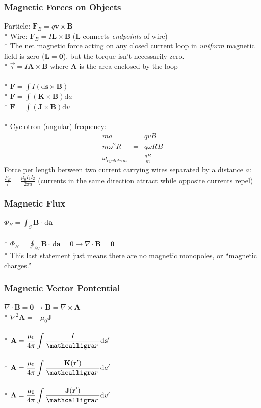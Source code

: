 \subsubsection{Magnetic Forces on Objects}
Particle: \(\mathbf{F}_B=q\mathbf{v}\times\mathbf{B}\)\\*
Wire:  \(\mathbf{F}_B=I\mathbf{L}\times\mathbf{B}\) (\(\mathbf{L}\) connects \emph{endpoints} of wire)\\*
The net magnetic force acting on any closed current loop in \emph{uniform} magnetic field is zero (\(\mathbf{L}=\mathbf{0}\)), but the torque isn't necessarily zero.\\*
\(\vec{\tau}=I\mathbf{A}\times\mathbf{B}\) where \(\mathbf{A}\) is the area enclosed by the loop\\\\*
\(\mathbf{F}=\int I(\mathrm{d}\mathbf{s}\times\mathbf{B})\)\\*
\(\mathbf{F}=\int (\mathbf{K}\times\mathbf{B})\mathrm{d}a\)\\*
\(\mathbf{F}=\int (\mathbf{J}\times\mathbf{B})\mathrm{d}v\)\\\\*
Cyclotron (angular) frequency:
\begin{eqnarray}
ma&=&qvB \nonumber\\
m\omega^2R&=&q\omega RB \nonumber\\
\omega_{cyclotron}&=&\frac{qB}{m} \nonumber
\end{eqnarray}
Force per length between two current carrying wires separated by a distance \(a\): \(\displaystyle\frac{F_B}{l}=\frac{\mu_0I_1I_2}{2\pi a}\) (currents in the same direction attract while opposite currents repel)

\subsubsection{Magnetic Flux}
\(\Phi_B=\int_S\mathbf{B}\cdot\,\mathrm{d}\mathbf{a}\)\\\\*
\(\displaystyle\Phi_B=\oint_{\delta V}\mathbf{B}\cdot\,\mathrm{d}\mathbf{a}=0\to\nabla\cdot\mathbf{B}=\mathbf{0}\)\\*
This last statement just means there are no magnetic monopoles, or ``magnetic charges.''

\subsubsection{Magnetic Vector Pontential}
\(\nabla\cdot\mathbf{B}=\mathbf{0}\to\mathbf{B}=\nabla\times\mathbf{A}\)\\*
\(\nabla^2\mathbf{A}=-\mu_0\mathbf{J}\)\\\\*
\(\displaystyle\mathbf{A}=\frac{\mu_0}{4\pi}\int\frac{I}{\scriptr}\mathrm{d}\mathbf{s}'\)\\\\*
\(\displaystyle\mathbf{A}=\frac{\mu_0}{4\pi}\int\frac{\mathbf{K}(\mathbf{r}')}{\scriptr}\mathrm{d}a'\)\\\\*
\(\displaystyle\mathbf{A}=\frac{\mu_0}{4\pi}\int\frac{\mathbf{J}(\mathbf{r}')}{\scriptr}\mathrm{d}v'\)

